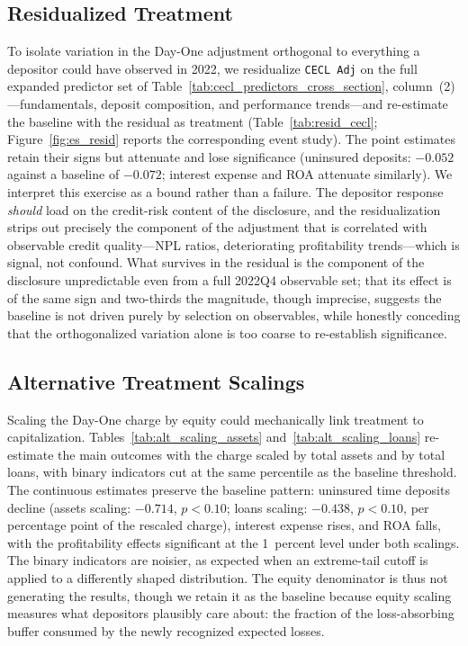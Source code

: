 \subsection{Residualized Treatment}
\label{sec:robustness:resid}

To isolate variation in the Day-One adjustment orthogonal to everything a
depositor could have observed in 2022, we residualize \texttt{CECL Adj} on
the full expanded predictor set of
Table~\ref{tab:cecl_predictors_cross_section}, column~(2)---fundamentals,
deposit composition, and performance trends---and re-estimate the baseline
with the residual as treatment (Table~\ref{tab:resid_cecl};
Figure~\ref{fig:es_resid} reports the corresponding event study).  The point
estimates retain their signs but attenuate and lose significance (uninsured
deposits: $-0.052$ against a baseline of $-0.072$; interest expense and ROA
attenuate similarly).  We interpret this exercise as a bound rather than a
failure.  The depositor response \emph{should} load on the credit-risk
content of the disclosure, and the residualization strips out precisely the
component of the adjustment that is correlated with observable credit
quality---NPL ratios, deteriorating profitability trends---which is signal,
not confound.  What survives in the residual is the component of the
disclosure unpredictable even from a full 2022Q4 observable set; that its
effect is of the same sign and two-thirds the magnitude, though imprecise,
suggests the baseline is not driven purely by selection on observables,
while honestly conceding that the orthogonalized variation alone is too
coarse to re-establish significance.

\subsection{Alternative Treatment Scalings}
\label{sec:robustness:scaling}

Scaling the Day-One charge by equity could mechanically link treatment to
capitalization.  Tables~\ref{tab:alt_scaling_assets}
and~\ref{tab:alt_scaling_loans} re-estimate the main outcomes with the
charge scaled by total assets and by total loans, with binary indicators cut
at the same percentile as the baseline threshold.  The continuous estimates
preserve the baseline pattern: uninsured time deposits decline (assets
scaling: $-0.714$, $p < 0.10$; loans scaling: $-0.438$, $p < 0.10$, per
percentage point of the rescaled charge), interest expense rises, and ROA
falls, with the profitability effects significant at the 1~percent level
under both scalings.  The binary indicators are noisier, as expected when an
extreme-tail cutoff is applied to a differently shaped distribution.  The
equity denominator is thus not generating the results, though we retain it
as the baseline because equity scaling measures what depositors plausibly
care about: the fraction of the loss-absorbing buffer consumed by the newly
recognized expected losses.

